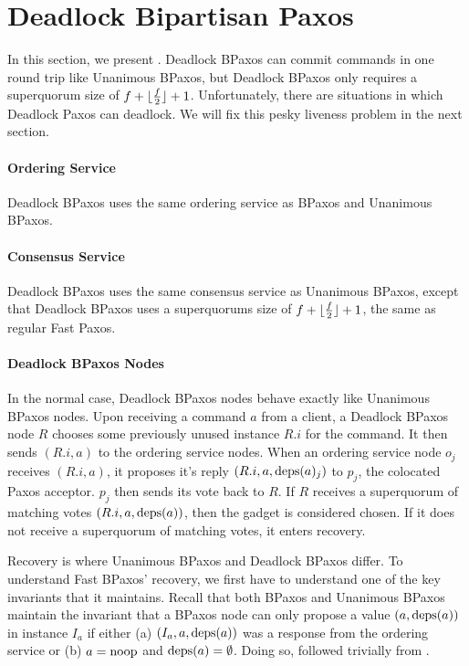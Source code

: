 \section{Deadlock Bipartisan Paxos}
In this section, we present . Deadlock
BPaxos can commit commands in one round trip like Unanimous BPaxos, but
Deadlock BPaxos only requires a superquorum size of $f + \lfloor\frac{f}{2}\rfloor +
1$. Unfortunately, there are situations in which Deadlock Paxos can deadlock.
We will fix this pesky liveness problem in the next section.

\paragraph{Ordering Service}
Deadlock BPaxos uses the same ordering service as BPaxos and Unanimous BPaxos.

\paragraph{Consensus Service}
Deadlock BPaxos uses the same consensus service as Unanimous BPaxos, except
that Deadlock BPaxos uses a superquorums size of $f + \lfloor\frac{f}{2}\rfloor + 1$,
the same as regular Fast Paxos.

\paragraph{Deadlock BPaxos Nodes}
In the normal case, Deadlock BPaxos nodes behave exactly like Unanimous BPaxos
nodes. Upon receiving a command $a$ from a client, a Deadlock BPaxos node $R$
chooses some previously unused instance $R.i$ for the command. It then sends
$(R.i, a)$ to the ordering service nodes.
%
When an ordering service node $o_j$ receives $(R.i, a)$, it proposes it's reply
$(R.i, a, \text{deps}(a)_j)$ to $p_j$, the colocated Paxos acceptor. $p_j$ then sends
its vote back to $R$.
%
If $R$ receives a superquorum of matching votes $(R.i, a, \text{deps}(a))$, then the
gadget is considered chosen. If it does not receive a superquorum of matching
votes, it enters recovery.

Recovery is where Unanimous BPaxos and Deadlock BPaxos differ. To understand Fast
BPaxos' recovery, we first have to understand one of the key invariants that it
maintains. Recall that both BPaxos and Unanimous BPaxos maintain the invariant
that a BPaxos node can only propose a value $(a, \text{deps}(a))$ in instance $I_a$
if either (a) $(I_a, a, \text{deps}(a))$ was a response from the ordering service or
(b) $a = \text{noop}$ and $\text{deps}(a) = \emptyset$. Doing so,
 followed trivially from .

